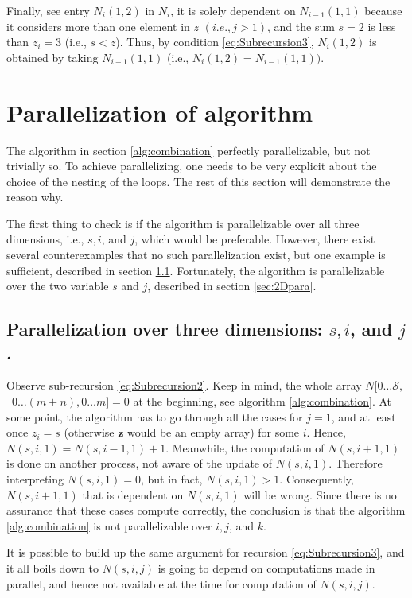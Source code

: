 \documentclass[a4paper]{article}
\begin{document}
Finally, see entry $N_{i}(1,2)$ in $N_{i}$, it is solely dependent on $N_{i-1}(1,1)$ because it considers more than one element in $z$ $(i.e., j>1)$, and the sum $s=2$ is less than $z_{i}=3$ (i.e., $s<z$). Thus, by condition \ref{eq:Subrecursion3},  $N_{i}(1,2)$ is obtained by taking $N_{i-1}(1,1)$ (i.e., $N_{i}(1,2)=N_{i-1}(1,1)).$

\section{Parallelization of algorithm}
\label{sec:paraAlgo}
The algorithm in section \ref{alg:combination} perfectly parallelizable, but not trivially so. To achieve parallelizing, one needs to be very explicit about the choice of the nesting of the loops. The rest of this section will demonstrate the reason why.

The first thing to check is if the algorithm is parallelizable over all three dimensions, i.e., $s, i$, and $j$, which would be preferable. However, there exist several counterexamples that no such parallelization exist, but one example is sufficient, described in section \ref{sec:3Dpara}. Fortunately, the algorithm is parallelizable over the two variable $s$ and $j$, described in section \ref{sec:2Dpara}.

\subsection{Parallelization over three dimensions: $s, i$, and $j$.}
\label{sec:3Dpara}
Observe sub-recursion \ref{eq:Subrecursion2}. Keep in mind, the whole array $N[0\ldots \mathcal{S},$\ $0\ldots(m+n),0\ldots m]=0$ at the beginning, see algorithm \ref{alg:combination}.  At some point, the algorithm has to go through all the cases for $j=1$, and at least once $z_{i}=s$ (otherwise $\bm{z}$ would be an empty array) for some $i$. Hence, $N(s,i,1) = N(s,i-1,1)+1$. Meanwhile, the computation of $N(s,i+1,1)$ is done on another process, not aware of the update of $N(s,i,1)$. Therefore interpreting $N(s,i,1)=0$, but in fact, $N(s,i,1)>1$. Consequently, $N(s,i+1,1)$ that is dependent on $N(s,i,1)$ will be wrong. Since there is no assurance that these cases compute correctly, the conclusion is that the algorithm \ref{alg:combination} is not parallelizable over $i,j$, and $k$.

It is possible to build up the same argument for recursion \ref{eq:Subrecursion3}, and it all boils down to $N(s,i,j)$ is going to depend on computations made in parallel, and hence not available at the time for computation of $N(s,i,j)$.
\end{document}
